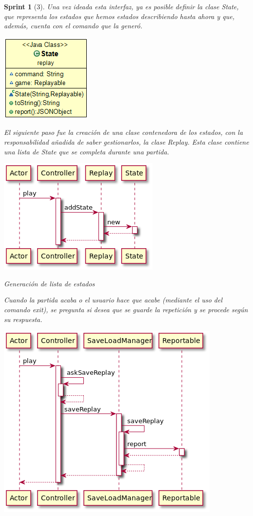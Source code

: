 \documentclass{article}
\theoremstyle{break}
\newtheorem*{sprint}{Sprint}
\begin{document}
\begin{sprint}[3]
Una vez ideada esta interfaz, ya es posible definir la clase \textit{State}, que representa los estados que hemos estados describiendo hasta ahora y que, además, cuenta con el comando que la generó.

\begin{center}
\includegraphics[scale=0.5]{state-sprint-3.png}
\end{center}

El siguiente paso fue la creación de una clase contenedora de los estados, con la responsabilidad añadida de saber gestionarlos, la clase \textit{Replay}. Esta clase contiene una lista de \textit{State} que se completa durante una partida.

\begin{center}
\includegraphics[scale=0.6]{addState-replay-sprint-3.png}

Generación de lista de estados
\end{center}

Cuando la partida acaba o el usuario hace que acabe (mediante el uso del comando exit), se pregunta si desea que se guarde la repetición y se procede según su respuesta.

\begin{center}
\includegraphics[scale=0.6]{saveReplay-sprint3.png}


\end{center}
\end{sprint}
\end{document}

